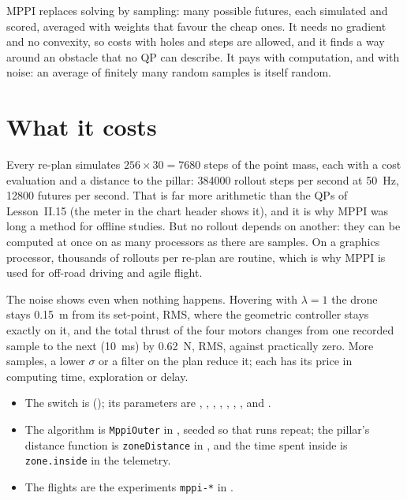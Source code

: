 \begin{keyidea}
MPPI replaces solving by sampling: many possible futures, each simulated and scored, averaged with weights that favour the cheap ones. It needs no gradient and no convexity, so costs with holes and steps are allowed, and it finds a way around an obstacle that no QP can describe. It pays with computation, and with noise: an average of finitely many random samples is itself random.
\end{keyidea}

\section{What it costs}

Every re-plan simulates $256 \times 30 = 7680$ steps of the point mass, each with a cost evaluation and a distance to the pillar: \num{384000} rollout steps per second at \SI{50}{Hz}, \num{12800} futures per second. That is far more arithmetic than the QPs of Lesson~II.15 (the meter in the chart header shows it), and it is why MPPI was long a method for offline studies. But no rollout depends on another: they can be computed at once on as many processors as there are samples. On a graphics processor, thousands of rollouts per re-plan are routine, which is why MPPI is used for off-road driving and agile flight.

\begin{watchout}
The noise shows even when nothing happens. Hovering with $\lambda = 1$ the drone stays \SI{0.15}{m} from its set-point, RMS, where the geometric controller stays exactly on it, and the total thrust of the four motors changes from one recorded sample to the next (\SI{10}{ms}) by \SI{0.62}{N}, RMS, against practically zero. More samples, a lower $\sigma$ or a filter on the plan reduce it; each has its price in computing time, exploration or delay.
\end{watchout}

\begin{inapp}
\begin{itemize}[leftmargin=1.2em]
  \item The switch is  (); its parameters are , , , , , , ,  and .
  \item The algorithm is \texttt{MppiOuter} in , seeded so that runs repeat; the pillar's distance function is \texttt{zoneDistance} in , and the time spent inside is \texttt{zone.inside} in the telemetry.
  \item The flights are the experiments \texttt{mppi-*} in .
\end{itemize}
\end{inapp}

